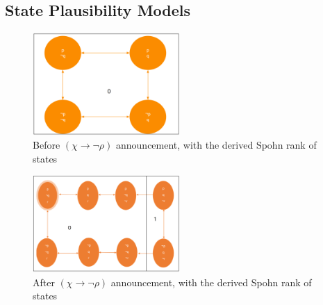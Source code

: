\documentclass[12pt, titlepage, twoside]{report}
\begin{document}
\subsection{State Plausibility Models}
\quad
\newline
\begin{figure}[h!]
  \centering
  \includegraphics[width=0.5\textwidth]{slide25.eps}
  \caption{Before $(\chi \to \neg \rho)$ announcement, with the derived Spohn rank of states}
\end{figure}
\begin{figure}[h!]
  \centering
  \includegraphics[width=0.5\textwidth]{slide27.eps}
  \caption{After $(\chi \to \neg \rho)$ announcement, with the derived Spohn rank of states}
\end{figure}
\quad
\newline
\end{document}
